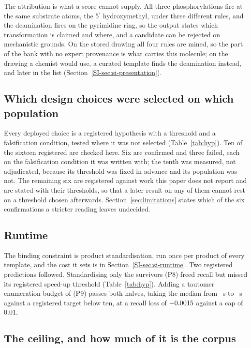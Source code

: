 The attribution is what a score cannot supply. All three phosphorylations fire at the same
substrate atoms, the 5$^\prime$ hydroxymethyl, under three different rules, and the deamination
fires on the pyrimidine ring, so the output states which transformation is claimed and where,
and a candidate can be rejected on mechanistic grounds. On the stored drawing all four rules are mined, so the part of the bank with no expert provenance is what carries this molecule; on the drawing a chemist would use, a curated template finds the deamination instead, and later in the list (Section~\ref{SI-sec:si-presentation}).
\subsection{Which design choices were selected on which population}

Every deployed choice is a registered hypothesis with a threshold and a falsification condition,
tested where it was not selected (Table~\ref{tab:hyp}). Ten of the sixteen registered are checked
here. Six are confirmed and three failed, each on the falsification condition it was written
with; the tenth was measured, not adjudicated, because its threshold was fixed in advance
and its population was not. The remaining six are registered against work this paper does not report and are stated
with their thresholds, so that a later result on any of them cannot rest on a threshold chosen
afterwards. Section~\ref{sec:limitations} states which of the six confirmations a stricter
reading leaves undecided.



\subsection{Runtime}

The binding constraint is product standardisation, run once per product of every template, and the cost it sets is in Section~\ref{SI-sec:si-runtime}. Two registered predictions followed. Standardising only the survivors (P8) freed recall but missed its registered speed-up threshold (Table~\ref{tab:hyp}). Adding a
tautomer enumeration budget of \numHOneFiveBudget{} (P9) passes both halves, taking the median from
\numHOneThreeTimeBefore~s to \numHOneFiveTime~s against a registered target below ten, at a recall
loss of $-0.0015$ against a cap of $0.01$.

\subsection{The ceiling, and how much of it is the corpus}
\label{sec:ceiling}

